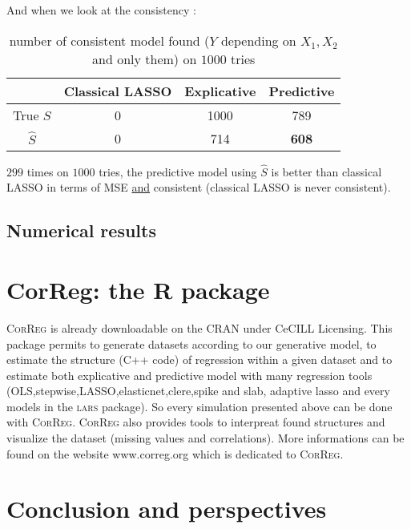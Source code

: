 \documentclass[11pt,a4paper]{report}
\begin{document}
		And when we look at the consistency :
		\begin{table}[h!]
		\centering	
		\begin{tabular}{|c|c|c|c|}
		\hline 
		 & Classical LASSO & Explicative & Predictive \\ 
		\hline 
		True $S$ &  0 & 1000 & 789 \\ 
		\hline 
		$\hat{S}$ & 0 & 714 & \textbf{608} \\ 
		\hline 
		\end{tabular} 
		\caption{number of consistent model found ($Y$ depending on $X_1,X_2$ and only them) on $1000$ tries}
		\end{table}				
				
		
		$299$ times on $1000$ tries, the predictive model using $\hat{S}$ is better than classical LASSO in terms of MSE \underline{and} consistent (classical LASSO is never consistent).
		

	\section{Numerical results}

\chapter{CorReg: the R package}	
	
		\textsc{CorReg} is already downloadable on the CRAN under CeCILL Licensing. This package permits to generate datasets according to our generative model, to estimate the structure (C++ code) of regression within a given dataset and to estimate both explicative and predictive model with many regression tools (OLS,stepwise,LASSO,elasticnet,clere,spike and slab, adaptive lasso and every models in the \textsc{lars} package). So every simulation presented above can be done with \textsc{CorReg}.
	\textsc{CorReg} also provides tools to interpreat found structures and visualize the dataset (missing values and correlations). More informations can be found on the website www.correg.org which is dedicated to \textsc{CorReg}.
	
\chapter{Conclusion and perspectives}

\cleardoublepage



\appendix
\end{document}
